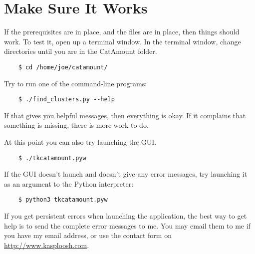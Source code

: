 \section{Make Sure It Works}

If the prerequisites are in place, and the files are in place, then things
should work. To test it, open up a terminal window.
In the terminal window, change directories until you are in the CatAmount
folder.

\begin{verbatim}
    $ cd /home/joe/catamount/
\end{verbatim}

Try to run one of the command-line programs:

\begin{verbatim}
    $ ./find_clusters.py --help
\end{verbatim}

If that gives you helpful messages, then everything is okay. If it complains
that something is missing, there is more work to do.

At this point you can also try launching the GUI.

\begin{verbatim}
    $ ./tkcatamount.pyw
\end{verbatim}

If the GUI doesn't launch and doesn't give any error messages, try launching
it as an argument to the Python interpreter:

\begin{verbatim}
    $ python3 tkcatamount.pyw
\end{verbatim}

If you get persistent errors when launching the application, the best way to
get help is to send the complete error messages to me. You may email them to
me if you have my email address, or use the contact form on
\url{http://www.kasploosh.com}.
